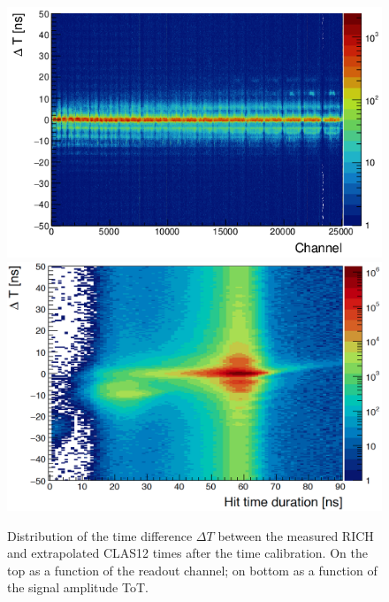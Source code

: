 \documentclass[5p,times,twocolumn]{elsarticle}
\def\dT{$\Delta T$ }
\begin{document}
\begin{figure}[t]
\begin{center}
\includegraphics[width=0.9\columnwidth]{dt_vs_anode_cor.png}
\includegraphics[width=0.9\columnwidth]{dt_vs_dur_cor.png}
\end{center}
\caption{Distribution of the time difference \dT between the measured RICH and extrapolated CLAS12 times after
  the time calibration. On the top as a function of the readout channel; on bottom as a function of the signal amplitude ToT.}
\label{Fig:DT_corr}
\end{figure}
\end{document}
